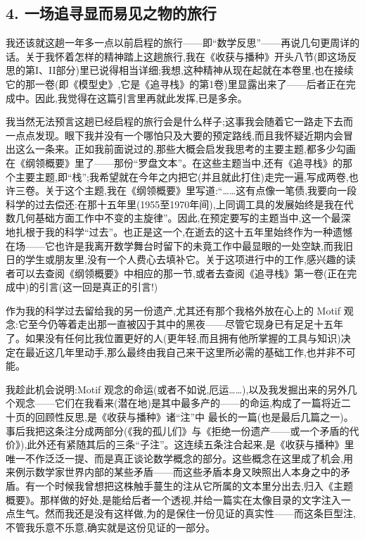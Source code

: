 \subsection{4. 一场追寻显而易见之物的旅行}

我还该就这趟一年多一点以前启程的旅行——即“数学反思”——再说几句更周详的话。关于我怀着怎样的精神踏上这趟旅行,我在《收获与播种》开头八节(即这场反思的第I、II部分)里已说得相当详细;我想,这种精神从现在起就在本卷里,也在接续它的那一卷(即《模型史》,它是《追寻栈》的第1卷)里显露出来了——后者正在完成中。因此,我觉得在这篇引言里再就此发挥,已是多余。

我当然无法预言这趟已经启程的旅行会是什么样子;这事我会随着它一路走下去而一点点发现。眼下我并没有一个哪怕只及大要的预定路线,而且我怀疑近期内会冒出这么一条来。正如我前面说过的,那些大概会启发我思考的主要主题,都多少勾画在《纲领概要》里了——那份“罗盘文本”。在这些主题当中,还有《追寻栈》的那个主要主题,即“栈”;我希望就在今年之内把它(并且就此打住)走完一遍,写成两卷,也许三卷。关于这个主题,我在《纲领概要》里写道:“……这有点像一笔债,我要向一段科学的过去偿还:在那十五年里(1955至1970年间),上同调工具的发展始终是我在代数几何基础方面工作中不变的主旋律”。因此,在预定要写的主题当中,这一个最深地扎根于我的科学“过去”。也正是这一个,在逝去的这十五年里始终作为一种遗憾在场——它也许是我离开数学舞台时留下的未竟工作中最显眼的一处空缺,而我旧日的学生或朋友里,没有一个人费心去填补它。关于这项进行中的工作,感兴趣的读者可以去查阅《纲领概要》中相应的那一节,或者去查阅《追寻栈》第一卷(正在完成中)的引言(这一回是真正的引言!)

作为我的科学过去留给我的另一份遗产,尤其还有那个我格外放在心上的 Motif 观念:它至今仍等着走出那一直被囚于其中的黑夜——尽管它现身已有足足十五年了。如果没有任何比我位置更好的人(更年轻,而且拥有他所掌握的工具与知识)决定在最近这几年里动手,那么最终由我自己来干这里所必需的基础工作,也并非不可能。

我趁此机会说明:Motif 观念的命运(或者不如说,厄运……),以及我发掘出来的另外几个观念——它们在我看来(潜在地)是其中最多产的——的命运,构成了一篇将近二十页的回顾性反思,是《收获与播种》诸“注”中
%
 最长的一篇(也是最后几篇之一)。事后我把这条注分成两部分(《我的孤儿们》与《拒绝一份遗产——或一个矛盾的代价》),此外还有紧随其后的三条“子注”。这连续五条注合起来,是《收获与播种》里唯一不作泛泛一提、而是真正谈论数学概念的部分。这些概念在这里成了机会,用来例示数学家世界内部的某些矛盾——而这些矛盾本身又映照出人本身之中的矛盾。有一个时候我曾想把这株触手蔓生的注从它所属的文本里分出去,归入《主题概要》。那样做的好处,是能给后者一个透视,并给一篇实在太像目录的文字注入一点生气。然而我还是没有这样做,为的是保住一份见证的真实性——而这条巨型注,不管我乐意不乐意,确实就是这份见证的一部分。

